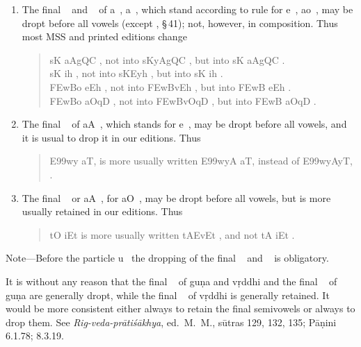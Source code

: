 \begin{enumerate}
\item The final {\dn {}}~ and {\dn {}}~ of {\dn a}~,
  {\dn a}~, which stand according to rule for {\dn e}~,
  {\dn ao}~, may be dropt before all vowels (except , \S\,41);
  not, however, in composition. Thus most MSS and printed editions
  change

  \begin{quote}
    {\dn sK\? aAgQC} , not into {\dn sKyAgQC}
    , but into {\dn sK aAgQC} .\\
    {\dn sK\? ih} , not into {\dn sKEyh} , but
    into {\dn sK ih} .\\
    {\dn \3FEwBo eEh} , not into {\dn \3FEwBv\?Eh} ,
    but into {\dn \3FEwB eEh} .\\
    {\dn \3FEwBo aOqD\2} , not into
    {\dn \3FEwBvOqD\2} , but into {\dn \3FEwB
    aOqD\2} .
  \end{quote}

\item The final {\dn {}}~ of {\dn aA}~, which stands for
  {\dn e\?}~, may be dropt before all vowels, and it is usual to drop
  it in our editions. Thus

  \begin{quote}
    {\dn E\399wy\4 aT\0,}  is more usually written
    {\dn E\399wyA aT\0,}  instead of {\dn E\399wyAyT\0,}
    .
  \end{quote}

\item The final {\dn {}}~ or {\dn aA}~, for {\dn aO}~, may be
  dropt before all vowels, but is more usually retained in our editions.
  Thus

  \begin{quote}
    {\dn tO iEt}  is more usually written {\dn tAEvEt}
    , and not {\dn tA iEt} .
  \end{quote}
\end{enumerate}

\begin{note}
  Note—Before the particle {\dn u}~ the dropping of the final
  {\dn {}}~ and {\dn {}}~ is obligatory.

  It is without any reason that the final {\dn {}}~ of guṇa and vṛddhi
  and the final {\dn {}}~ of guṇa are generally dropt, while the final
  {\dn {}}~ of vṛddhi is generally retained. It would be more
  consistent either always to retain the final semivowels or always to
  drop them. See \emph{Rig-veda-prātiśākhya}, ed.\ M.\ M., sūtras 129,
  132, 135; Pāṇini 6.1.78; 8.3.19.
\end{note}

